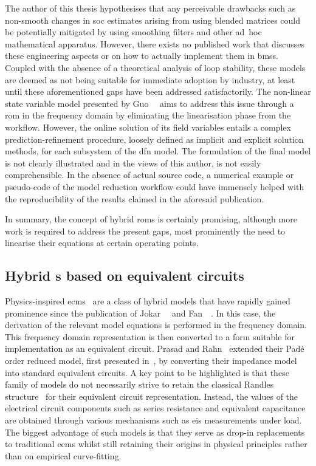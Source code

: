 The author  of this thesis hypothesises  that any perceivable drawbacks  such as
non-smooth changes  in \gls{soc} estimates  arising from using  blended matrices
could  be potentially  mitigated by  using  smoothing filters  and other
\mbox{ad hoc} mathematical apparatus. However,  there exists no published  work
that discusses these engineering aspects  or on how to actually implement  them
in \glspl{bms}. Coupled with  the absence  of a  theoretical analysis  of loop
stability, these models are deemed  as not being suitable for immediate
adoption by industry, at least until  these aforementioned gaps  have been
addressed  satisfactorily. The non-linear state variable model  presented by
Guo~\etal{}~\cite{Guo2017} aims to address this  issue through a \gls{rom}  in
the frequency domain  by eliminating the linearisation phase  from the workflow.
However, the online  solution of its field  variables  entails  a complex
prediction-refinement  procedure,  loosely defined as  implicit and explicit
solution methods,  for each subsystem  of the \gls{dfn} model. The  formulation
of the final model is  not clearly illustrated and in the views of this author,
is not easily comprehensible. In the absence of actual source  code, a numerical
example  or pseudo-code of the  model reduction workflow could  have immensely
helped with the  reproducibility of  the results claimed in the aforesaid
publication.

In summary, the  concept of hybrid \glspl{rom} is  certainly promising, although
more work is required to address the  present gaps, most prominently the need to
linearise their equations at certain operating points.


\subsection{Hybrid s based on equivalent circuits}\label{subsec:hybridroms}

Physics-inspired
\glspl{ecm}~\cite{Prasad2012,Prasad2014,Zhang2017,Cheng2017,Merla2018}
are a class of hybrid models that have rapidly gained prominence since the
publication of Jokar~\etal~\cite{Jokar2016} and Fan~\etal~\cite{Fan2015}. In
this case, the derivation of the relevant model equations is performed in
the frequency domain. This frequency domain representation is then converted
to a form suitable for implementation as an equivalent circuit. Prasad
and Rahn~\cite{Prasad2014} extended their Padé order reduced model, first
presented in~\cite{Prasad2013}, by converting their impedance model into
standard equivalent circuits. A key point to be highlighted is that these
family of models do not necessarily strive to retain the classical Randles
structure~\cite{Randles1947} for their equivalent circuit representation.
Instead, the values of the electrical circuit components such as series
resistance and equivalent capacitance are obtained through various mechanisms
such as \gls{eis} measurements under load. The biggest advantage of such
models is that they serve as drop-in replacements to traditional \glspl{ecm}
whilst still retaining their origins in physical principles rather than on
empirical curve-fitting.


